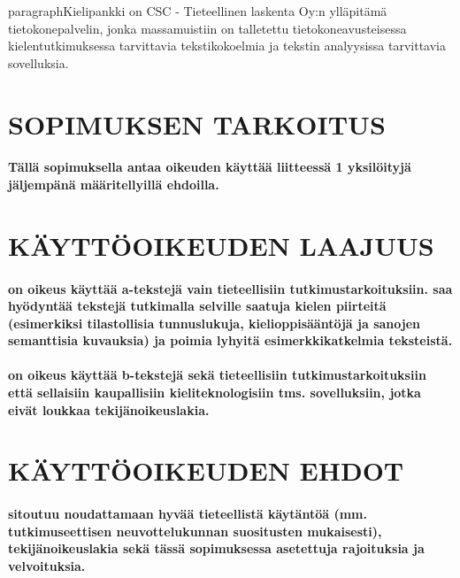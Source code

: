 \documentclass[a4paper,finnish]{article}
\begin{document}
paragraph{Kielipankki on CSC - Tieteellinen laskenta Oy:n ylläpitämä
tietokonepalvelin, jonka massamuistiin on talletettu
tietokoneavusteisessa kielentutkimuksessa tarvittavia tekstikokoelmia
ja tekstin analyysissa tarvittavia sovelluksia.}

\section{SOPIMUKSEN TARKOITUS}

\paragraph{Tällä sopimuksella  antaa
 oikeuden käyttää liitteessä 1 yksilöityjä 
 jäljempänä määritellyillä ehdoilla.}

\section{KÄYTTÖOIKEUDEN LAAJUUS}

\paragraph{ on oikeus käyttää a-tekstejä
vain tieteellisiin tutkimustarkoituksiin. 
saa hyödyntää tekstejä tutkimalla selville saatuja kielen piirteitä
(esimerkiksi tilastollisia tunnuslukuja, kielioppisääntöjä ja sanojen
semanttisia kuvauksia) ja poimia lyhyitä esimerkkikatkelmia
teksteistä.}

\paragraph{ on oikeus käyttää b-tekstejä
sekä tieteellisiin tutkimustarkoituksiin että sellaisiin kaupallisiin
kieliteknologisiin tms. sovelluksiin, jotka eivät loukkaa
tekijänoikeuslakia.}

\section{KÄYTTÖOIKEUDEN EHDOT}

\paragraph{ sitoutuu noudattamaan hyvää
tieteellistä käytäntöä (mm. tutkimuseettisen neuvottelukunnan
suositusten mukaisesti), tekijänoikeuslakia sekä tässä sopimuksessa
asetettuja rajoituksia ja velvoituksia.}
\end{document}
